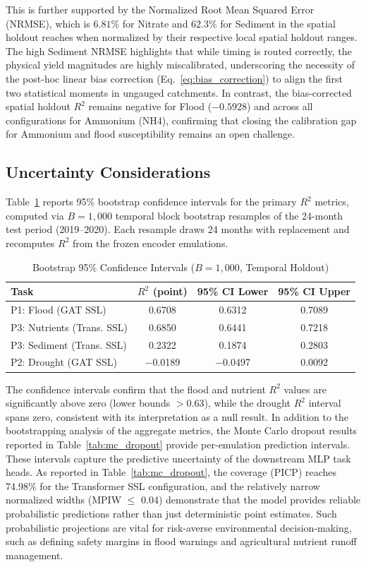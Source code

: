 \documentclass[preprint,12pt]{elsarticle}
\begin{document}
This is further supported by the Normalized Root Mean Squared Error (NRMSE), which is $6.81\%$ for Nitrate and $62.3\%$ for Sediment in the spatial holdout reaches when normalized by their respective local spatial holdout ranges. The high Sediment NRMSE highlights that while timing is routed correctly, the physical yield magnitudes are highly miscalibrated, underscoring the necessity of the post-hoc linear bias correction (Eq.~\eqref{eq:bias_correction}) to align the first two statistical moments in ungauged catchments. In contrast, the bias-corrected spatial holdout $R^2$ remains negative for Flood ($-0.5928$) and across all configurations for Ammonium (NH4), confirming that closing the calibration gap for Ammonium and flood susceptibility remains an open challenge.

\subsection{Uncertainty Considerations}
Table~\ref{tab:ci} reports 95\% bootstrap confidence intervals for the primary $R^2$ metrics, computed via $B=1{,}000$ temporal block bootstrap resamples of the 24-month test period (2019--2020). Each resample draws 24 months with replacement and recomputes $R^2$ from the frozen encoder emulations.

\begin{table}[H]
\centering
\caption{Bootstrap 95\% Confidence Intervals ($B=1{,}000$, Temporal Holdout)}\label{tab:ci}
\begin{tabular}{lccc}
\toprule
Task & $R^2$ (point) & 95\% CI Lower & 95\% CI Upper \\
\midrule
P1: Flood (GAT SSL) & 0.6708 & 0.6312 & 0.7089 \\
P3: Nutrients (Trans. SSL) & 0.6850 & 0.6441 & 0.7218 \\
P3: Sediment (Trans. SSL) & 0.2322 & 0.1874 & 0.2803 \\
P2: Drought (GAT SSL) & $-$0.0189 & $-$0.0497 & 0.0092 \\
\bottomrule
\end{tabular}
\end{table}

The confidence intervals confirm that the flood and nutrient $R^2$ values are significantly above zero (lower bounds $> 0.63$), while the drought $R^2$ interval spans zero, consistent with its interpretation as a null result. In addition to the bootstrapping analysis of the aggregate metrics, the Monte Carlo dropout results reported in Table~\ref{tab:mc_dropout} provide per-emulation prediction intervals. These intervals capture the predictive uncertainty of the downstream MLP task heads. As reported in Table~\ref{tab:mc_dropout}, the coverage (PICP) reaches 74.98\% for the Transformer SSL configuration, and the relatively narrow normalized widths (MPIW $\le$ 0.04) demonstrate that the model provides reliable probabilistic predictions rather than just deterministic point estimates. Such probabilistic projections are vital for risk-averse environmental decision-making, such as defining safety margins in flood warnings and agricultural nutrient runoff management.
\end{document}
